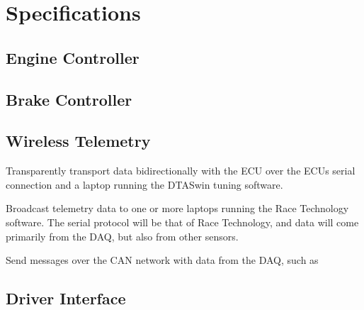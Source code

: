 %
%
%
%

\section{Specifications}

\subsection{Engine Controller}
\subsection{Brake Controller}
\subsection{Wireless Telemetry}

Transparently transport data bidirectionally with the ECU over the ECUs serial
connection and a laptop running the DTASwin tuning software.

Broadcast telemetry data to one or more laptops running the Race Technology
software. The serial protocol will be that of Race Technology, and data will
come primarily from the DAQ, but also from other sensors.

Send messages over the CAN network with data from the DAQ, such as

\subsection{Driver Interface}
